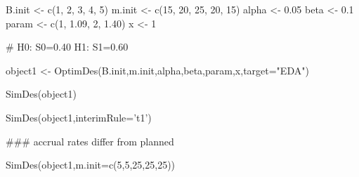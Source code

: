 \begin{Examples}
\begin{ExampleCode}
B.init <- c(1, 2, 3, 4, 5)
m.init <- c(15, 20, 25, 20, 15)
alpha <- 0.05
beta <- 0.1
param <- c(1, 1.09, 2, 1.40)
x <- 1

# H0: S0=0.40 H1: S1=0.60

object1 <- OptimDes(B.init,m.init,alpha,beta,param,x,target="EDA")

SimDes(object1)

SimDes(object1,interimRule='t1')

### accrual rates differ from planned

SimDes(object1,m.init=c(5,5,25,25,25))
\end{ExampleCode}
\end{Examples}

